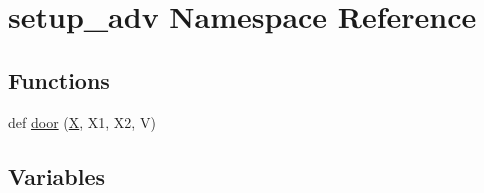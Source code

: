 \hypertarget{namespacesetup__adv}{}\section{setup\+\_\+adv Namespace Reference}
\label{namespacesetup__adv}
\subsection*{Functions}
\begin{DoxyCompactItemize}
\item 
def \hyperlink{namespacesetup__adv_a38bed8824f69a250682029a7205ee046}{door} (\hyperlink{namespacesetup__adv_a6d9cd2ec966fe51739f30fabc346a12b}{X}, X1, X2, V)
\end{DoxyCompactItemize}
\subsection*{Variables}
